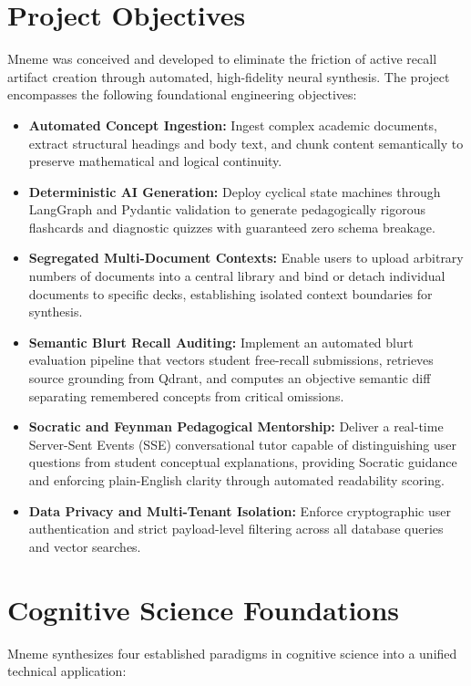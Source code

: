 \documentclass[12pt,a4paper,oneside]{report}
\begin{document}
\section{Project Objectives}
Mneme was conceived and developed to eliminate the friction of active recall artifact creation through automated, high-fidelity neural synthesis. The project encompasses the following foundational engineering objectives:
\begin{itemize}
    \item \textbf{Automated Concept Ingestion:} Ingest complex academic documents, extract structural headings and body text, and chunk content semantically to preserve mathematical and logical continuity.
    \item \textbf{Deterministic AI Generation:} Deploy cyclical state machines through LangGraph and Pydantic validation to generate pedagogically rigorous flashcards and diagnostic quizzes with guaranteed zero schema breakage.
    \item \textbf{Segregated Multi-Document Contexts:} Enable users to upload arbitrary numbers of documents into a central library and bind or detach individual documents to specific decks, establishing isolated context boundaries for synthesis.
    \item \textbf{Semantic Blurt Recall Auditing:} Implement an automated blurt evaluation pipeline that vectors student free-recall submissions, retrieves source grounding from Qdrant, and computes an objective semantic diff separating remembered concepts from critical omissions.
    \item \textbf{Socratic and Feynman Pedagogical Mentorship:} Deliver a real-time Server-Sent Events (SSE) conversational tutor capable of distinguishing user questions from student conceptual explanations, providing Socratic guidance and enforcing plain-English clarity through automated readability scoring.
    \item \textbf{Data Privacy and Multi-Tenant Isolation:} Enforce cryptographic user authentication and strict payload-level filtering across all database queries and vector searches.
\end{itemize}

\section{Cognitive Science Foundations}
Mneme synthesizes four established paradigms in cognitive science into a unified technical application:
\end{document}
